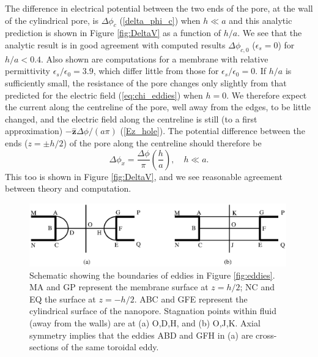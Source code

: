 The difference in
electrical potential between the two ends of the
pore, at the wall of the cylindrical pore, is
$\Delta\phi_c$ (\ref{delta_phi_c}) when $h\ll a$
and this analytic prediction is shown
in Figure \ref{fig:DeltaV}
as a function of $h/a$. We see that the analytic result is in good 
agreement with computed results $\Delta\phi_{c,0}$ ($\epsilon_s=0$)
for $h/a<0.4$.
Also shown are computations for a membrane with relative permittivity
$\epsilon_s/\epsilon_0=3.9$, which differ little from those for
$\epsilon_s/\epsilon_0=0$.
If $h/a$ is sufficiently small, the resistance
of the pore changes only slightly \cite{sherwood2014} from that predicted for
the electric field (\ref{eq:chi_eddies})
when $h=0$.  We therefore expect the current along the
centreline of the pore, well away from the edges,
to be little changed, and the electric field
along the centreline is  still (to a first approximation)
$-\hat{\mathbf{z}}\Delta\phi/(a\pi)$
(\ref{Ez_hole}). The potential difference
between the ends ($z=\pm h/2$) of the pore along the centreline
should therefore be
\begin{equation}
\Delta\phi_x=\frac{\Delta\phi}{\pi}\left(\frac{h}{a}\right),\quad h\ll a.
\label{delta_phi_x}
\end{equation}
This too is shown in Figure \ref{fig:DeltaV}, and we see reasonable agreement
between theory and computation.

\begin{figure}[ht]
\centering
\includegraphics[width=0.99\textwidth,clip=true]{eddies/eddy_fig5.eps}
\caption{Schematic showing the boundaries of eddies in Figure \ref{fig:eddies}.
MA and GP represent the membrane surface at $z=h/2$; NC and EQ
the surface at $z=-h/2$. ABC and GFE represent the cylindrical surface of the
nanopore. Stagnation points within fluid (away from the walls)
are at (a) O,D,H, and (b) O,J,K. Axial symmetry implies that
the eddies ABD and GFH in (a) are cross-sections of the same toroidal eddy.
\label{fig:eddy_schematic}}
\end{figure}

